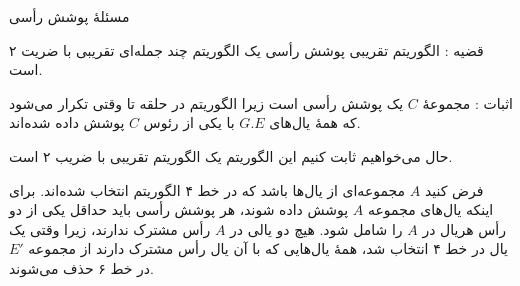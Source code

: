 \begin{itemframe}{‌مسئلهٔ پوشش رأسی}
\item[\textbullet]
قضیه : الگوریتم تقریبی پوشش رأسی یک الگوریتم چند جمله‌ای تقریبی با ضریت ۲ است.
\item[\textbullet]
اثبات : مجموعهٔ
$C$
یک پوشش رأسی است زیرا الگوریتم در حلقه تا وقتی تکرار می‌شود که همهٔ یال‌های
$G.E$
با یکی از رئوس
$C$
پوشش داده شده‌اند.
\item[\textbullet]
حال می‌خواهیم ثابت کنیم این الگوریتم یک الگوریتم تقریبی با ضریب ۲ است.
\item[\textbullet]
فرض کنید
$A$
مجموعه‌ای از یال‌ها باشد که در خط ۴ الگوریتم انتخاب شده‌اند. برای اینکه یال‌های مجموعه
$A$
پوشش داده شوند، هر پوشش رأسی باید حداقل یکی از دو رأس هریال در
$A$
را شامل شود. هیچ دو یالی در
$A$
رأس مشترک ندارند، زیرا وقتی یک یال در خط ۴ انتخاب شد، همهٔ یال‌هایی که با آن یال رأس مشترک دارند از مجموعه
$E'$
در خط ۶ حذف می‌شوند.
\end{itemframe}
\iffalse

\begin{itemframe}{‌مسئلهٔ پوشش رأسی}
\itm
بنابراین هیچ دویالی در
$A$
با یک رأس از
$C^*$
پوشش داده نشده‌اند و این بدین معنی است که به ازای هر رأس در
$C^*$
، حداکثر یک یال در
$A$
وجود دارد و بنابراین داریم :
\begin{align*}
$|C^*| \geqslant |A|$
\end{align*}
\itm
هر اجرای خط ۴ یک یال را انتخاب \می‌کند که هیچ‌کدام از دو رأس مجاور آن در
$C$
نیستند و بنابراین داریم :
\begin{align*}
$|C| = 2 |A|$
\end{align*}
\itm
با استفاده از دو رابطهٔ به دست آمده خواهیم داشت :
\begin{align*}
$|C| = 2 |A| \leqslant 2|C^*|$
\end{align*}
و قضیه بدین ترتیب اثبات می‌شود.
\end{itemframe}
\fi